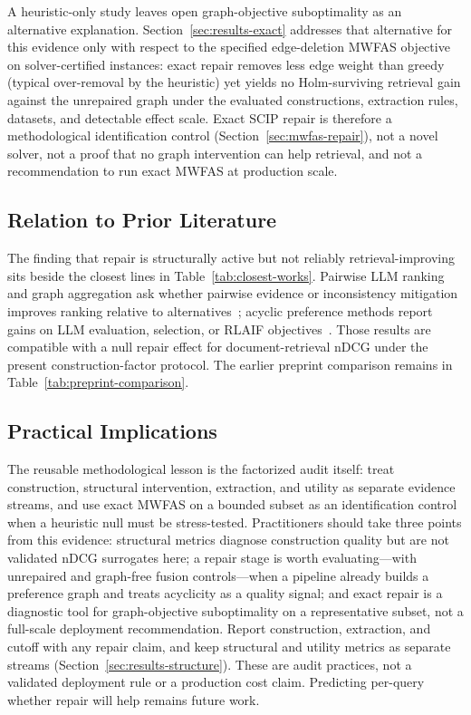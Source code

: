 \documentclass[pdflatex,sn-basic,Numbered]{sn-jnl}
\begin{document}
A heuristic-only study leaves open graph-objective suboptimality as an
alternative explanation. Section~\ref{sec:results-exact} addresses that
alternative for this evidence only with respect to the specified
edge-deletion MWFAS objective on solver-certified instances: exact repair
removes less edge weight than greedy (typical over-removal by the
heuristic) yet yields no Holm-surviving retrieval gain against the
unrepaired graph under the evaluated constructions, extraction rules,
datasets, and detectable effect scale. Exact SCIP repair is therefore a
methodological identification control (Section~\ref{sec:mwfas-repair}), not
a novel solver, not a proof that no graph intervention can help retrieval,
and not a recommendation to run exact MWFAS at production scale.

\subsection{Relation to Prior Literature}
\label{sec:discussion-literature}

The finding that repair is structurally active but not reliably
retrieval-improving sits beside the closest lines in
Table~\ref{tab:closest-works}. Pairwise LLM ranking and graph aggregation
ask whether pairwise evidence or inconsistency mitigation improves ranking
relative to alternatives~\cite{qin-etal-2024-large,luo2024prpgraph,zeng2026llmrankfusion};
acyclic preference methods report gains on LLM evaluation, selection, or
RLAIF objectives~\cite{hu2026acyclic,liu2025votinggraph}. Those results are
compatible with a null repair effect for document-retrieval nDCG under the
present construction-factor protocol. The earlier preprint comparison remains
in Table~\ref{tab:preprint-comparison}.

\subsection{Practical Implications}
\label{sec:discussion-practical}

The reusable methodological lesson is the factorized audit itself: treat
construction, structural intervention, extraction, and utility as separate
evidence streams, and use exact MWFAS on a bounded subset as an
identification control when a heuristic null must be stress-tested.
Practitioners should take three points from this evidence: structural
metrics diagnose construction quality but are not validated nDCG
surrogates here; a repair stage is worth evaluating---with unrepaired and
graph-free fusion controls---when a pipeline already builds a preference
graph and treats acyclicity as a quality signal; and exact repair is a
diagnostic tool for graph-objective suboptimality on a representative
subset, not a full-scale deployment recommendation. Report construction,
extraction, and cutoff with any repair claim, and keep structural and
utility metrics as separate streams (Section~\ref{sec:results-structure}).
These are audit practices, not a validated deployment rule or a production
cost claim. Predicting per-query whether repair will help remains future
work.
\end{document}
